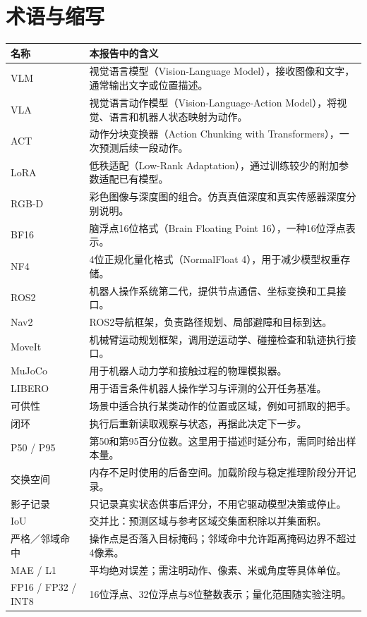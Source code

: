 \chapter{术语与缩写}
\begin{longtable}{p{.18\linewidth}p{.72\linewidth}}
\toprule 名称 & 本报告中的含义\\\midrule\endhead
VLM & 视觉语言模型（Vision-Language Model），接收图像和文字，通常输出文字或位置描述。\\
VLA & 视觉语言动作模型（Vision-Language-Action Model），将视觉、语言和机器人状态映射为动作。\\
ACT & 动作分块变换器（Action Chunking with Transformers），一次预测后续一段动作。\\
LoRA & 低秩适配（Low-Rank Adaptation），通过训练较少的附加参数适配已有模型。\\
RGB-D & 彩色图像与深度图的组合。仿真真值深度和真实传感器深度分别说明。\\
BF16 & 脑浮点16位格式（Brain Floating Point 16），一种16位浮点表示。\\
NF4 & 4位正规化量化格式（NormalFloat 4），用于减少模型权重存储。\\
ROS2 & 机器人操作系统第二代，提供节点通信、坐标变换和工具接口。\\
Nav2 & ROS2导航框架，负责路径规划、局部避障和目标到达。\\
MoveIt & 机械臂运动规划框架，调用逆运动学、碰撞检查和轨迹执行接口。\\
MuJoCo & 用于机器人动力学和接触过程的物理模拟器。\\
LIBERO & 用于语言条件机器人操作学习与评测的公开任务基准。\\
可供性 & 场景中适合执行某类动作的位置或区域，例如可抓取的把手。\\
闭环 & 执行后重新读取观察与状态，再据此决定下一步。\\
P50 / P95 & 第50和第95百分位数。这里用于描述时延分布，需同时给出样本量。\\
交换空间 & 内存不足时使用的后备空间。加载阶段与稳定推理阶段分开记录。\\
影子记录 & 只记录真实状态供事后评分，不用它驱动模型决策或停止。\\
IoU & 交并比：预测区域与参考区域交集面积除以并集面积。\\
严格／邻域命中 & 操作点是否落入目标掩码；邻域命中允许距离掩码边界不超过4像素。\\
MAE / L1 & 平均绝对误差；需注明动作、像素、米或角度等具体单位。\\
FP16 / FP32 / INT8 & 16位浮点、32位浮点与8位整数表示；量化范围随实验注明。\\

\end{longtable}
